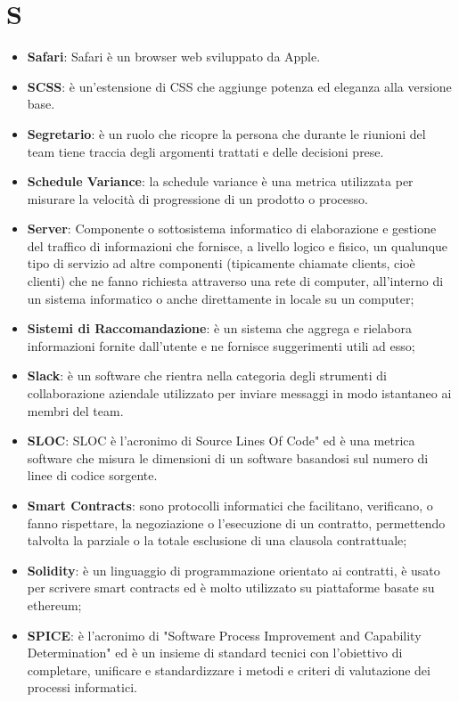 \documentclass[a4paper, oneside, openany]{article}
\begin{document}
\section{S}
\begin{itemize}
\item \textbf{Safari}: Safari è un browser web sviluppato da Apple.
\item \textbf{SCSS}: è un'estensione di CSS che aggiunge potenza ed eleganza alla versione base.
\item \textbf{Segretario}: è un ruolo che ricopre la persona che durante le riunioni del team tiene traccia degli argomenti trattati e delle decisioni prese.
\item \textbf{Schedule Variance}: la schedule variance è una metrica utilizzata per misurare la velocità di progressione di un prodotto o processo.
\item \textbf{Server}: Componente o sottosistema informatico di elaborazione e gestione del traffico di informazioni che fornisce, a livello logico e fisico, un qualunque tipo di servizio ad altre componenti (tipicamente chiamate clients, cioè clienti) che ne fanno richiesta attraverso una rete di computer, all’interno di un sistema informatico o anche direttamente in locale su un computer;
\item \textbf{Sistemi di Raccomandazione}: è un sistema che aggrega e rielabora informazioni fornite dall'utente e ne fornisce suggerimenti utili ad esso;
\item \textbf{Slack}: è un software che rientra nella categoria degli strumenti di collaborazione aziendale utilizzato per inviare messaggi in modo istantaneo ai membri del team.
\item \textbf{SLOC}: SLOC è l'acronimo di Source Lines Of Code"  ed è una metrica software che misura le dimensioni di un software basandosi sul numero di linee di codice sorgente.
\item \textbf{Smart Contracts}: sono protocolli informatici che facilitano, verificano, o fanno rispettare, la negoziazione o l'esecuzione di un contratto, permettendo talvolta la parziale o la totale esclusione di una clausola contrattuale;
\item \textbf{Solidity}: è un linguaggio di programmazione orientato ai contratti, è usato per scrivere smart contracts ed è molto utilizzato su piattaforme basate su ethereum;
\item \textbf{SPICE}: è l'acronimo di "Software Process Improvement and Capability Determination" ed è un insieme di standard tecnici con l’obiettivo di completare, unificare e standardizzare i metodi e criteri di valutazione dei processi informatici.

\end{itemize}
\end{document}
